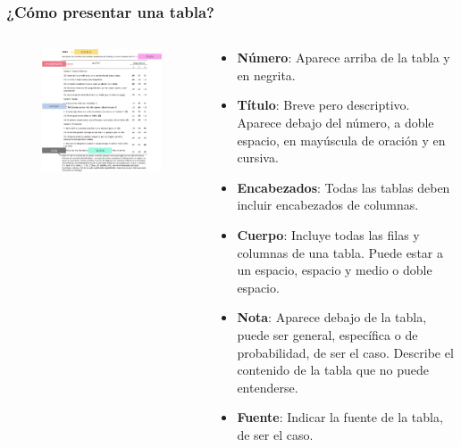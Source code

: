\documentclass[
11pt, %
]{beamer}
\begin{document}
\begin{frame}
	\frametitle{¿Cómo presentar una tabla?}

	\begin{columns}[c] %
		\begin{column}{0.5\textwidth} %
			\begin{figure}[H]
				\centering
				\includegraphics[width=1\linewidth]{images/screenshot004}
			\end{figure}
		\end{column}
		\begin{column}{0.5\textwidth} %
			\scriptsize
			\begin{itemize}
				\item \textbf{Número}: Aparece arriba de la tabla y en negrita.
				\item \textbf{Título}: Breve pero descriptivo. Aparece debajo del número, a doble espacio, en mayúscula de oración y en cursiva.
				\item \textbf{Encabezados}: Todas las tablas deben incluir encabezados de columnas.
				\item \textbf{Cuerpo}: Incluye todas las filas y columnas de una tabla. Puede estar a un espacio, espacio y medio o doble espacio.
				\item \textbf{Nota}: Aparece debajo de la tabla, puede ser general, específica o de probabilidad, de ser el caso. Describe el contenido de la tabla que no puede entenderse.
				\item \textbf{Fuente}: Indicar la fuente de la tabla, de ser el caso.
			\end{itemize}

		\end{column}
	\end{columns}

\end{frame}
\end{document}
